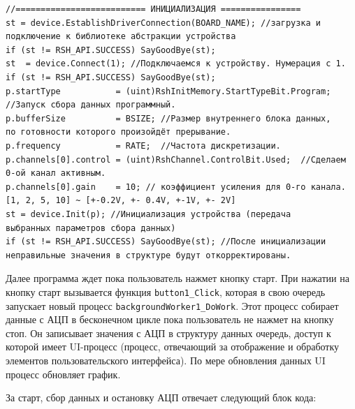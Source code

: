 \documentclass[../paper.tex]{subfiles}
\begin{document}
\begin{verbatim}
//========================== ИНИЦИАЛИЗАЦИЯ ================        
st = device.EstablishDriverConnection(BOARD_NAME); //загрузка и 
подключение к библиотеке абстракции устройства
if (st != RSH_API.SUCCESS) SayGoodBye(st);
st  = device.Connect(1); //Подключаемся к устройству. Нумерация с 1.
if (st != RSH_API.SUCCESS) SayGoodBye(st);
p.startType           = (uint)RshInitMemory.StartTypeBit.Program; 
//Запуск сбора данных программный. 
p.bufferSize          = BSIZE; //Размер внутреннего блока данных, 
по готовности которого произойдёт прерывание.
p.frequency           = RATE;  //Частота дискретизации.
p.channels[0].control = (uint)RshChannel.ControlBit.Used;  //Сделаем 
0-ой канал активным.
p.channels[0].gain    = 10; // коэффициент усиления для 0-го канала. 
[1, 2, 5, 10] ~ [+-0.2V, +- 0.4V, +-1V, +- 2V]
st = device.Init(p); //Инициализация устройства (передача 
выбранных параметров сбора данных)
if (st != RSH_API.SUCCESS) SayGoodBye(st); //После инициализации 
неправильные значения в структуре будут откорректированы.
\end{verbatim}

Далее программа ждет пока пользователь нажмет кнопку старт. При нажатии на кнопку старт вызывается функция \verb|button1_Click|, которая в свою очередь запускает новый процесс \verb|backgroundWorker1_DoWork|. Этот процесс собирает данные с АЦП в бесконечном цикле пока пользователь не нажмет на кнопку стоп. Он записывает значения с АЦП в структуру данных очередь, доступ к которой имеет UI-процесс (процесс, отвечающий за отображение и обработку элементов пользовательского интерфейса). По мере обновления данных UI процесс обновляет график.

За старт, сбор данных и остановку АЦП отвечает следующий блок кода: 
\end{document}
